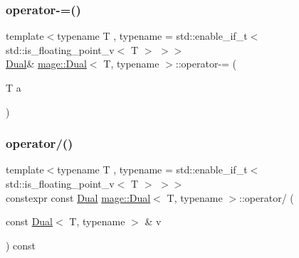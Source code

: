 \subsubsection{\texorpdfstring{operator-\/=()}{operator-=()}\hspace{0.1cm}{\footnotesize\ttfamily [2/2]}}
{\footnotesize\ttfamily template$<$typename T , typename  = std\+::enable\+\_\+if\+\_\+t$<$ std\+::is\+\_\+floating\+\_\+point\+\_\+v$<$ T $>$ $>$$>$ \\
\mbox{\hyperlink{structmage_1_1_dual}{Dual}}\& \mbox{\hyperlink{structmage_1_1_dual}{mage\+::\+Dual}}$<$ T, typename $>$\+::operator-\/= (\begin{DoxyParamCaption}\item[{T}]{a }\end{DoxyParamCaption})\hspace{0.3cm}{\ttfamily [noexcept]}}

\mbox{\label{structmage_1_1_dual_acf8a212375f31cde83ba33b9d5a836e8}} 
\subsubsection{\texorpdfstring{operator/()}{operator/()}\hspace{0.1cm}{\footnotesize\ttfamily [1/2]}}
{\footnotesize\ttfamily template$<$typename T , typename  = std\+::enable\+\_\+if\+\_\+t$<$ std\+::is\+\_\+floating\+\_\+point\+\_\+v$<$ T $>$ $>$$>$ \\
constexpr const \mbox{\hyperlink{structmage_1_1_dual}{Dual}} \mbox{\hyperlink{structmage_1_1_dual}{mage\+::\+Dual}}$<$ T, typename $>$\+::operator/ (\begin{DoxyParamCaption}\item[{const \mbox{\hyperlink{structmage_1_1_dual}{Dual}}$<$ T, typename $>$ \&}]{v }\end{DoxyParamCaption}) const\hspace{0.3cm}{\ttfamily [noexcept]}}

\mbox{\label{structmage_1_1_dual_ac6454648f6fc0822a16d6b7787a9a672}} 
